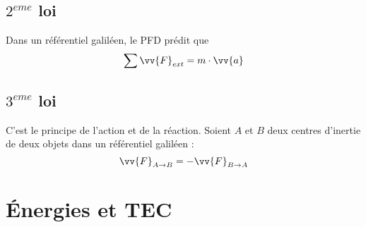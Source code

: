 \documentclass[../MAIN/main.tex]{subfiles}
\begin{document}
\subsection{$2^{eme}$ loi}

\begin{Definition}
Dans un référentiel galiléen, le PFD prédit que
$$\sum \vv{F}_{ext} = m\cdot \vv{a} $$
\end{Definition}

\subsection{$3^{eme}$ loi}

\begin{Definition}
C'est le principe de l'action et de la réaction. Soient $A$ et $B$ deux centres d'inertie de deux objets dans un référentiel galiléen :
$$\vv{F}_{A\rightarrow B} = - \vv{F}_{B\rightarrow A}$$

\end{Definition}


\section{Énergies et TEC}
\end{document}
